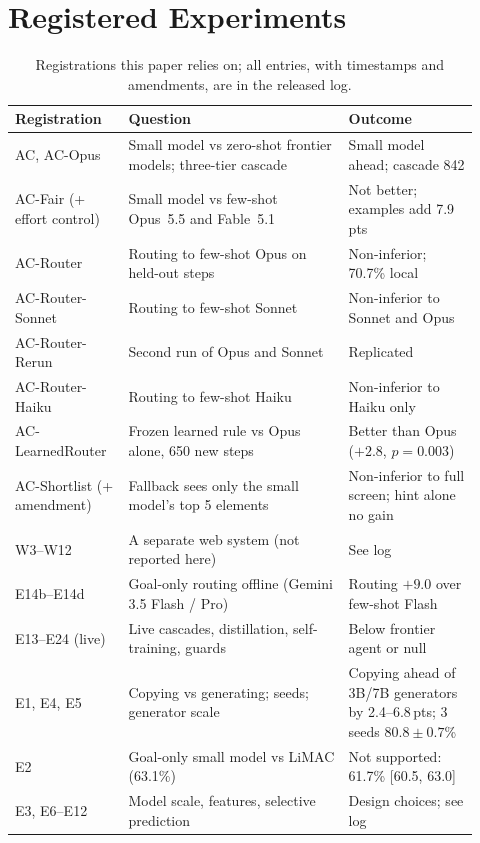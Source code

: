 \documentclass[10pt]{article}
\newcommand{\pts}{\,pts}
\begin{document}
\section{Registered Experiments}\label{app:reg}
\begin{table}[!htbp]\centering\small
\caption{Registrations this paper relies on; all entries, with timestamps and amendments, are in the released log.}\label{tab:reg}
\begin{tabular}{p{0.22\linewidth}p{0.44\linewidth}p{0.26\linewidth}}\toprule
Registration & Question & Outcome\\\midrule
AC, AC-Opus & Small model vs zero-shot frontier models; three-tier cascade & Small model ahead; cascade 842\\
AC-Fair (+ effort control) & Small model vs few-shot Opus~5.5 and Fable~5.1 & Not better; examples add 7.9\pts\\
AC-Router & Routing to few-shot Opus on held-out steps & Non-inferior; 70.7\% local\\
AC-Router-Sonnet & Routing to few-shot Sonnet & Non-inferior to Sonnet and Opus\\
AC-Router-Rerun & Second run of Opus and Sonnet & Replicated\\
AC-Router-Haiku & Routing to few-shot Haiku & Non-inferior to Haiku only\\
AC-LearnedRouter & Frozen learned rule vs Opus alone, 650 new steps & Better than Opus ($+2.8$, $p=0.003$)\\
AC-Shortlist (+ amendment) & Fallback sees only the small model's top 5 elements & Non-inferior to full screen; hint alone no gain\\
W3--W12 & A separate web system (not reported here) & See log\\
E14b--E14d & Goal-only routing offline (Gemini 3.5 Flash / Pro) & Routing $+9.0$ over few-shot Flash\\
E13--E24 (live) & Live cascades, distillation, self-training, guards & Below frontier agent or null\\
E1, E4, E5 & Copying vs generating; seeds; generator scale & Copying ahead of 3B/7B generators by 2.4--6.8\pts; 3 seeds $80.8\pm0.7$\%\\
E2 & Goal-only small model vs LiMAC (63.1\%) & Not supported: 61.7\% [60.5, 63.0]\\
E3, E6--E12 & Model scale, features, selective prediction & Design choices; see log\\\bottomrule
\end{tabular}\end{table}
\end{document}
